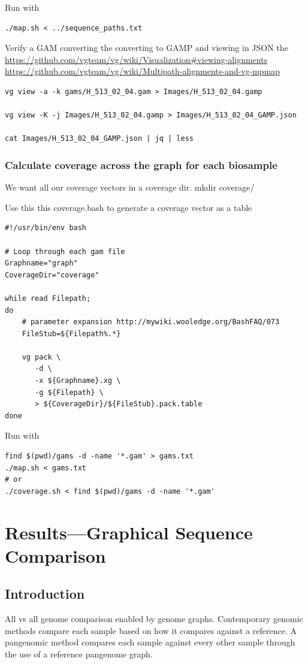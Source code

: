 \documentclass[a4paper]{article}
\begin{document}
\begin{enumerate}
Run with

\begin{verbatim}
./map.sh < ../sequence_paths.txt
\end{verbatim}

Verify a GAM converting the converting to GAMP and viewing in JSON the
\url{https://github.com/vgteam/vg/wiki/Visualization\#viewing-alignments}
\url{https://github.com/vgteam/vg/wiki/Multipath-alignments-and-vg-mpmap}

\begin{verbatim}
vg view -a -k gams/H_513_02_04.gam > Images/H_513_02_04.gamp

vg view -K -j Images/H_513_02_04.gamp > Images/H_513_02_04_GAMP.json

cat Images/H_513_02_04_GAMP.json | jq | less
\end{verbatim}
\end{enumerate}
\subsubsection{Calculate coverage across the graph for each biosample}
\label{sec:org2ba108c}
We want all our coverage vectors in a coverage dir.
mkdir coverage/

Use this this coverage.bash to generate a coverage vector as a table

\begin{verbatim}
#!/usr/bin/env bash

# Loop through each gam file
Graphname="graph"
CoverageDir="coverage"

while read Filepath;
do
    # parameter expansion http://mywiki.wooledge.org/BashFAQ/073
    FileStub=${Filepath%.*}

    vg pack \
       -d \
       -x ${Graphname}.xg \
       -g ${Filepath} \
       > ${CoverageDir}/${FileStub}.pack.table
done
\end{verbatim}

Run with

\begin{verbatim}
find $(pwd)/gams -d -name '*.gam' > gams.txt
./map.sh < gams.txt
# or
./coverage.sh < find $(pwd)/gams -d -name '*.gam'
\end{verbatim}
\section{Results---Graphical Sequence Comparison}
\label{sec:orgcf092de}
\subsection{Introduction}
\label{sec:org1aa067b}
All vs all genome comparison enabled by genome graphs.
Contemporary genomic methods compare each sample based on how it compares against a reference.
A pangenomic method compares each sample against every other sample through the use of a reference pangenome graph. 
\end{document}
